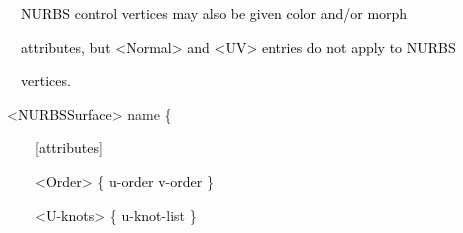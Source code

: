 \documentclass[a4paper]{article}
\newcommand\textstyleOOoComputerKeyWord[1]{\textrm{\textcolor[rgb]{0.0,0.0,0.5019608}{#1}}}
\newcommand\textstyleOOoAssemblerSpecialChar[1]{\textrm{\textcolor[rgb]{0.0,0.5019608,0.0}{#1}}}
\newcommand\textstyleOOoAssemblerIdent[1]{\textrm{\textcolor{black}{#1}}}
\newcommand\textstyleOOoAssemblerDirective[1]{\textrm{\textcolor[rgb]{0.0,0.5019608,1.0}{#1}}}
\begin{document}
\bigskip


\bigskip

{\color{black}
\textstyleOOoComputerKeyWord{\textcolor{black}{\ \ NURBS control vertices may also be given color and/or morph}}}

{\color{black}
\textstyleOOoComputerKeyWord{\textcolor{black}{\ \ attributes, but {\textless}Normal{\textgreater} and
{\textless}UV{\textgreater} entries do not apply to NURBS}}}

{\color{black}
\textstyleOOoComputerKeyWord{\textcolor{black}{\ \ vertices.}}}


\bigskip


\bigskip


\bigskip

{\color{black}
\textstyleOOoAssemblerSpecialChar{{\textless}}\textstyleOOoAssemblerIdent{NURBSSurface}\textstyleOOoAssemblerSpecialChar{{\textgreater}}\textstyleOOoComputerKeyWord{\textcolor{black}{
}}\textstyleOOoAssemblerDirective{name}\textstyleOOoComputerKeyWord{\textcolor{black}{
}}\textstyleOOoAssemblerSpecialChar{\{}}

{\color{black}
\textstyleOOoComputerKeyWord{\textcolor{black}{\ \ \ \ }}\textstyleOOoAssemblerSpecialChar{[}\textstyleOOoAssemblerIdent{attributes}\textstyleOOoAssemblerSpecialChar{]}\textstyleOOoComputerKeyWord{\textcolor{black}{
}}}


\bigskip

{\color{black}
\textstyleOOoComputerKeyWord{\textcolor{black}{\ \ \ \ }}\textstyleOOoAssemblerSpecialChar{{\textless}}\textstyleOOoAssemblerIdent{Order}\textstyleOOoAssemblerSpecialChar{{\textgreater}}\textstyleOOoComputerKeyWord{\textcolor{black}{
}}\textstyleOOoAssemblerSpecialChar{\{}\textstyleOOoComputerKeyWord{\textcolor{black}{
}}\textstyleOOoAssemblerIdent{u}\textstyleOOoAssemblerSpecialChar{{}-}\textstyleOOoAssemblerIdent{order}\textstyleOOoComputerKeyWord{\textcolor{black}{
}}\textstyleOOoAssemblerIdent{v}\textstyleOOoAssemblerSpecialChar{{}-}\textstyleOOoAssemblerIdent{order}\textstyleOOoComputerKeyWord{\textcolor{black}{
}}\textstyleOOoAssemblerSpecialChar{\}}}

{\color{black}
\textstyleOOoComputerKeyWord{\textcolor{black}{\ \ \ \ }}\textstyleOOoAssemblerSpecialChar{{\textless}}\textstyleOOoAssemblerIdent{U}\textstyleOOoAssemblerSpecialChar{{}-}\textstyleOOoAssemblerIdent{knots}\textstyleOOoAssemblerSpecialChar{{\textgreater}}\textstyleOOoComputerKeyWord{\textcolor{black}{
}}\textstyleOOoAssemblerSpecialChar{\{}\textstyleOOoComputerKeyWord{\textcolor{black}{
}}\textstyleOOoAssemblerIdent{u}\textstyleOOoAssemblerSpecialChar{{}-}\textstyleOOoAssemblerIdent{knot}\textstyleOOoAssemblerSpecialChar{{}-}\textstyleOOoAssemblerDirective{list}\textstyleOOoComputerKeyWord{\textcolor{black}{
}}\textstyleOOoAssemblerSpecialChar{\}}}
\end{document}
